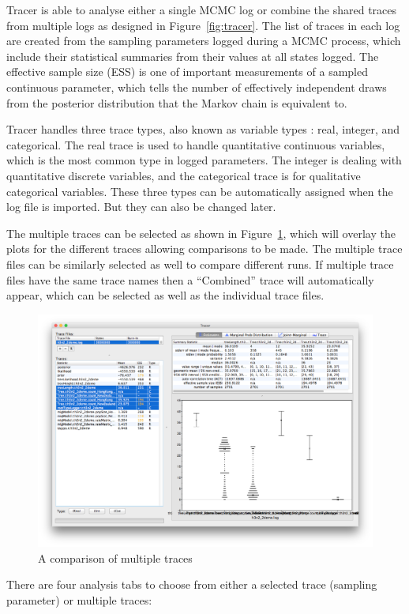 \documentclass{bioinfo}
\begin{document}
Tracer is able to analyse either a single MCMC log or combine the shared traces from multiple logs as designed in Figure~\ref{fig:tracer}. 
The list of traces in each log are created from the sampling parameters logged during a MCMC process, which include their statistical summaries from their values at all states logged. 
The effective sample size (ESS) is one of important measurements of a sampled continuous parameter, which tells the number of effectively independent draws from the posterior distribution that the Markov chain is equivalent to.

Tracer handles three trace types, also known as variable types \citep{mendenhall2012introduction}: real, integer, and categorical.
The real trace is used to handle quantitative continuous variables, which is the most common type in logged parameters.
The integer is dealing with quantitative discrete variables, and the categorical trace is for qualitative categorical variables. 
These three types can be automatically assigned when the log file is imported. But they can also be changed later. 

The multiple traces can be selected as shown in Figure~\ref{fig:multitrace}, which will overlay the plots for the different traces allowing comparisons to be made. The multiple trace files can be similarly selected as well to compare different runs. If multiple trace files have the same trace names then a ``Combined'' trace will automatically appear, which can be selected as well as the individual trace files.

\begin{figure}[ht]
\includegraphics[width=.5\textwidth]{./figures/multitrace.png}  
\caption{A comparison of multiple traces}
\label{fig:multitrace}
\end{figure}

There are four analysis tabs to choose from either a selected trace (sampling parameter) or multiple traces:
\end{document}
